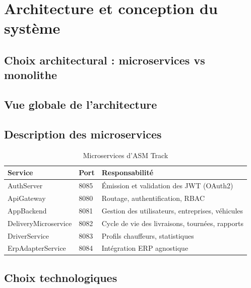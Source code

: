 \chapter{Architecture et conception du système}

\section{Choix architectural : microservices vs monolithe}

\section{Vue globale de l'architecture}


\section{Description des microservices}

\begin{table}[H]
\centering
\caption{Microservices d'ASM Track}
\begin{tabularx}{\textwidth}{|L{3.5cm}|C{1.5cm}|X|}
\hline
{}
\textbf{Service} & \textbf{Port} & \textbf{Responsabilité} \\
\hline
AuthServer & 8085 & Émission et validation des JWT (OAuth2) \\
\hline
ApiGateway & 8080 & Routage, authentification, RBAC \\
\hline
AppBackend & 8081 & Gestion des utilisateurs, entreprises, véhicules \\
\hline
DeliveryMicroservice & 8082 & Cycle de vie des livraisons, tournées, rapports \\
\hline
DriverService & 8083 & Profils chauffeurs, statistiques \\
\hline
ErpAdapterService & 8084 & Intégration ERP agnostique \\
\hline
\end{tabularx}
\end{table}

\section{Choix technologiques}

